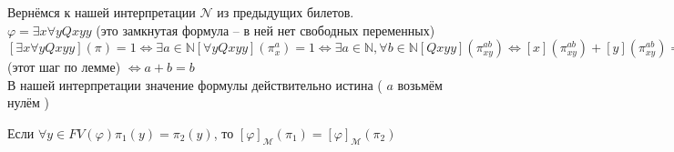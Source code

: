 \documentclass[a4paper, fleqn]{article}
\begin{document}
    \begin{example}
        Вернёмся к нашей интерпретации $\mathcal{N}$ из предыдущих билетов. \\[9.5pt]
        $\varphi = ∃ x ∀ y Qxyy$ (это замкнутая формула -- в ней нет свободных
        переменных) \\[9.5pt]
        $[∃ x ∀ y Qxyy](\pi) = 1 ⇔ ∃ a ∈ \mathbb{N} [∀ y Qxyy](\pi_x^a) = 1
        ⇔  ∃ a ∈ \mathbb{N}, ∀ b ∈ \mathbb{N} [Qxyy](\pi^{ab}_{xy})
        ⇔ [x](\pi^{ab}_{xy}) + [y](\pi^{ab}_{xy}) = [y](\pi^{ab}_{xy})
        ⇔ \pi_x^a(x) + \pi_y^b(y) = \pi_y^b(y)$ (этот шаг по лемме) 
        $⇔ a + b = b$ \\[9.5pt]
        В нашей интерпретации значение формулы действительно истина (
            $a$ возьмём нулём
        )   
    \end{example}
    \begin{lemma}
        Если $∀ y ∈ FV(\varphi) \pi_1(y) = \pi_2(y)$, то 
        $[\varphi]_{\mathcal{M}}(\pi_1) = [\varphi]_{\mathcal{M}}(\pi_2)$
    \end{lemma}
\end{document}
